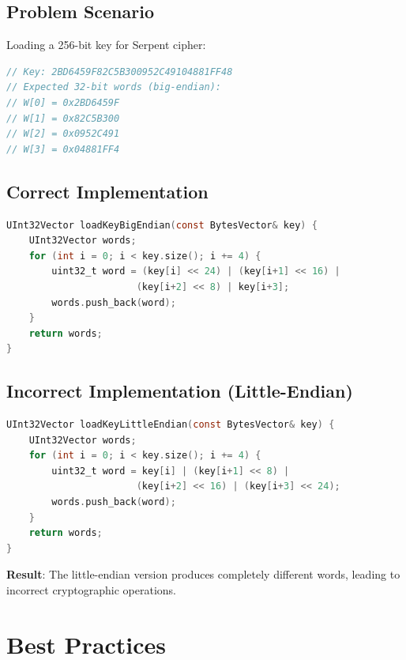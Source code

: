 \documentclass[11pt,a4paper]{article}
\begin{document}
\subsection{Problem Scenario}

Loading a 256-bit key for Serpent cipher:

\begin{lstlisting}[language=C, caption=Key Loading Example]
// Key: 2BD6459F82C5B300952C49104881FF48
// Expected 32-bit words (big-endian):
// W[0] = 0x2BD6459F
// W[1] = 0x82C5B300
// W[2] = 0x0952C491
// W[3] = 0x04881FF4
\end{lstlisting}

\subsection{Correct Implementation}

\begin{lstlisting}[language=C, caption=Correct Big-Endian Key Loading]
UInt32Vector loadKeyBigEndian(const BytesVector& key) {
    UInt32Vector words;
    for (int i = 0; i < key.size(); i += 4) {
        uint32_t word = (key[i] << 24) | (key[i+1] << 16) | 
                       (key[i+2] << 8) | key[i+3];
        words.push_back(word);
    }
    return words;
}
\end{lstlisting}

\subsection{Incorrect Implementation (Little-Endian)}

\begin{lstlisting}[language=C, caption=Incorrect Little-Endian Key Loading]
UInt32Vector loadKeyLittleEndian(const BytesVector& key) {
    UInt32Vector words;
    for (int i = 0; i < key.size(); i += 4) {
        uint32_t word = key[i] | (key[i+1] << 8) | 
                       (key[i+2] << 16) | (key[i+3] << 24);
        words.push_back(word);
    }
    return words;
}
\end{lstlisting}

\begin{warningbox}
\textbf{Result}: The little-endian version produces completely different words, leading to incorrect cryptographic operations.
\end{warningbox}

\section{Best Practices}
\end{document}
